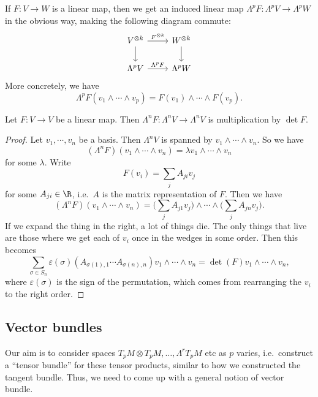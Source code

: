\documentclass[a4paper]{article}
\begin{document}
If $F: V \to W$ is a linear map, then we get an induced linear map $\Lambda^p F: \Lambda^p V \to \Lambda^p W$ in the obvious way, making the following diagram commute:
\[
  \begin{tikzcd}
    V^{\otimes k} \ar[r, "F^{\otimes k}"] \ar[d] & W^{\otimes k}\ar[d]\\
    \Lambda^p V \ar[r, "\Lambda^p F"] & \Lambda^p W
  \end{tikzcd}
\]
More concretely, we have
\[
  \Lambda^p F (v_1 \wedge \cdots \wedge v_p) = F(v_1) \wedge \cdots \wedge F(v_p).
\]
\begin{lemma}
  Let $F: V \to V$ be a linear map. Then $\Lambda^n F: \Lambda^n V \to \Lambda^n V$ is multiplication by $\det F$.
\end{lemma}

\begin{proof}
  Let $v_1, \cdots, v_n$ be a basis. Then $\Lambda^n V$ is spanned by $v_1 \wedge \cdots \wedge v_n$. So we have
  \[
    (\Lambda^n F)(v_1\wedge \cdots \wedge v_n) = \lambda v_1 \wedge \cdots \wedge v_n
  \]
  for some $\lambda$. Write
  \[
    F(v_i) = \sum_j A_{ji} v_j
  \]
  for some $A_{ji} \in \R$, i.e.\ $A$ is the matrix representation of $F$. Then we have
  \[
    (\Lambda^n F)(v_1 \wedge \cdots \wedge v_n) = \biggl(\sum_j A_{j1} v_j\biggr) \wedge \cdots \wedge \biggl(\sum_j A_{jn} v_j\biggr).
  \]
  If we expand the thing in the right, a lot of things die. The only things that live are those where we get each of $v_i$ once in the wedges in some order. Then this becomes
  \[
    \sum_{\sigma \in S_n} \varepsilon(\sigma) (A_{\sigma(1), 1} \cdots A_{\sigma(n), n}) v_1 \wedge \cdots \wedge v_n = \det(F) v_1 \wedge \cdots \wedge v_n,
  \]
  where $\varepsilon(\sigma)$ is the sign of the permutation, which comes from rearranging the $v_i$ to the right order.
\end{proof}

\subsection{Vector bundles}
Our aim is to consider spaces $T_p M \otimes T_p M, \ldots, \Lambda^r T_p M$ etc as $p$ varies, i.e.\ construct a ``tensor bundle'' for these tensor products, similar to how we constructed the tangent bundle. Thus, we need to come up with a general notion of vector bundle.
\end{document}
